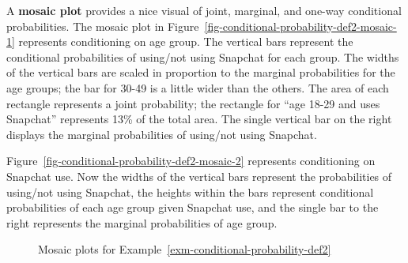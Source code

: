 \documentclass[
  letterpaper,
  DIV=11,
  numbers=noendperiod]{scrreprt}
\theoremstyle{plain}
\theoremstyle{definition}
\theoremstyle{definition}
\theoremstyle{definition}
\theoremstyle{remark}
\begin{document}
A \textbf{mosaic plot} provides a nice visual of
joint, marginal, and one-way conditional probabilities. The mosaic plot
in Figure~\ref{fig-conditional-probability-def2-mosaic-1} represents
conditioning on age group. The vertical bars represent the conditional
probabilities of using/not using Snapchat for each group. The widths of
the vertical bars are scaled in proportion to the marginal probabilities
for the age groups; the bar for 30-49 is a little wider than the others.
The area of each rectangle represents a joint probability; the rectangle
for ``age 18-29 and uses Snapchat'' represents 13\% of the total area.
The single vertical bar on the right displays the marginal probabilities
of using/not using Snapchat.

Figure~\ref{fig-conditional-probability-def2-mosaic-2} represents
conditioning on Snapchat use. Now the widths of the vertical bars
represent the probabilities of using/not using Snapchat, the heights
within the bars represent conditional probabilities of each age group
given Snapchat use, and the single bar to the right represents the
marginal probabilities of age group.

\begin{figure}

\begin{minipage}{0.50\linewidth}



\end{minipage}%
%
\begin{minipage}{0.50\linewidth}



\end{minipage}%

\caption{\label{fig-conditional-probability-def2-mosaic}Mosaic plots for
Example~\ref{exm-conditional-probability-def2}}

\end{figure}%
\end{document}
